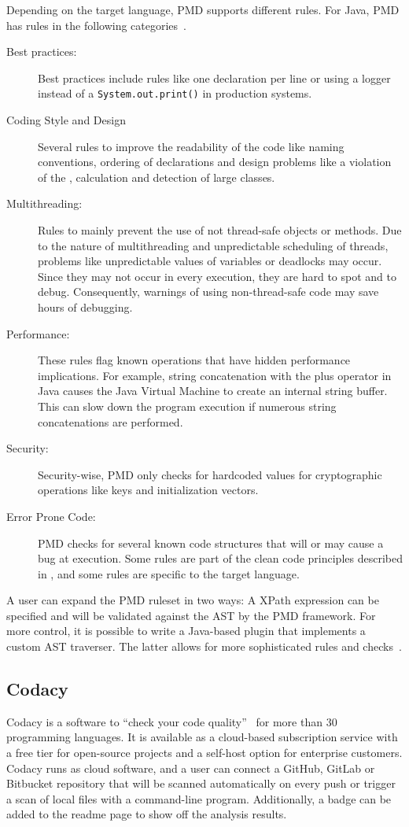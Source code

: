 Depending on the target language, PMD supports different rules. For Java, PMD has rules in the following categories~\cite{noauthor_documentation_nodate}.
\begin{description}
    \item[Best practices:] Best practices include rules like one declaration per line or using a logger instead of a \texttt{System.out.print()} in production systems.  
    \item[Coding Style and Design] Several rules to improve the readability of the code like naming conventions, ordering of declarations and design problems like a violation of the ,  calculation and detection of large classes.
    \item[Multithreading:]  Rules to mainly prevent the use of not thread-safe objects or methods. Due to the nature of multithreading and unpredictable scheduling of threads, problems like unpredictable values of variables or deadlocks may occur. Since they may not occur in every execution, they are hard to spot and to debug. Consequently, warnings of using non-thread-safe code may save hours of debugging.
    \item[Performance:] These rules flag known operations that have hidden performance implications. For example, string concatenation with the plus operator in Java causes the Java Virtual Machine to create an internal string buffer. This can slow down the program execution if numerous string concatenations are performed.
    \item[Security:] Security-wise, PMD only checks for hardcoded values for cryptographic operations like keys and initialization vectors.
    \item[Error Prone Code:] PMD checks for several known code structures that will or may cause a bug at execution. Some rules are part of the clean code principles described in , and some rules are specific to the target language.
\end{description}

A user can expand the PMD ruleset in two ways: A XPath expression can be specified and will be validated against the AST by the PMD framework. For more control, it is possible to write a Java-based plugin that implements a custom AST traverser. The latter allows for more sophisticated rules and checks~\cite{noauthor_documentation_nodate}.

\subsection{Codacy}
Codacy is a software to \enquote{check your code quality}~\cite{noauthor_codacy_nodate} for more than 30 programming languages. It is available as a cloud-based subscription service with a free tier for open-source projects and a self-host option for enterprise customers.  Codacy runs as cloud software, and a user can connect a GitHub, GitLab or Bitbucket repository that will be scanned automatically on every push or trigger a scan of local files with a command-line program. Additionally, a badge can be added to the readme page to show off the analysis results.

